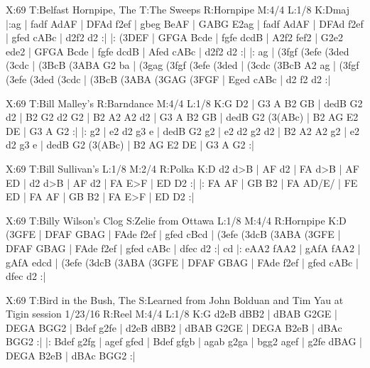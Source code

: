 \documentclass{article}
\begin{document}
\begin{abc}[name]
X:69
T:Belfast Hornpipe, The
T:The Sweeps
R:Hornpipe
M:4/4
L:1/8
K:Dmaj
|:ag | fadf AdAF | DFAd f2ef | gbeg BeAF | GABG E2ag |
fadf AdAF | DFAd f2ef | gfed cABc | d2f2 d2 :|
|: (3DEF | GFGA Bcde | fgfe dcdB | A2f2 fef2 | G2e2 ede2 |
GFGA Bcde | fgfe dcdB | Afed cABc | d2f2 d2 :|
|: ag | (3fgf (3efe (3ded (3cdc | (3BcB (3ABA G2 ba | (3gag (3fgf (3efe (3ded | (3cdc (3BcB A2 ag |
(3fgf (3efe (3ded (3cdc | (3BcB (3ABA (3GAG (3FGF | Eged cABc | d2 f2 d2 :|
\end{abc}

\begin{abc}[name]
X:69
T:Bill Malley's
R:Barndance
M:4/4
L:1/8
K:G
D2 | G3 A B2 GB | dedB G2 d2 | B2 G2 d2 G2 | B2 A2 A2 d2 |
G3 A B2 GB | dedB G2 (3(ABc) | B2 AG E2 DE | G3 A G2 :|
|: g2 | e2 d2 g3 e | dedB G2 g2 | e2 d2 g2 d2 | B2 A2 A2 g2 |
e2 d2 g3 e | dedB G2 (3(ABc) | B2 AG E2 DE | G3 A G2 :|
\end{abc}

\begin{abc}[name]
X:69
T:Bill Sullivan's
L:1/8
M:2/4
R:Polka
K:D
d2 d>B | AF d2 | FA d>B | AF ED |
d2 d>B | AF d2 | FA E>F | ED D2 :|
|: FA AF | GB B2 | FA AD/E/ | FE ED |
FA AF | GB B2 | FA E>F | ED D2 :|
\end{abc}

\begin{abc}[name]
X:69
T:Billy Wilson's Clog
S:Zelie from Ottawa
L:1/8
M:4/4
R:Hornpipe
K:D
(3GFE | DFAF GBAG | FAde f2ef | gfed cBcd | (3efe (3dcB (3ABA (3GFE |
DFAF GBAG | FAde f2ef | gfed cABc | dfec d2 :|
cd |: eAA2 fAA2 | gAfA fAA2 | gAfA edcd | (3efe (3dcB (3ABA (3GFE |
DFAF GBAG | FAde f2ef | gfed cABc | dfec d2 :|
\end{abc}

\begin{abc}[name]
X:69
T:Bird in the Bush, The
S:Learned from John Bolduan and Tim Yau at Tigin session 1/23/16
R:Reel
M:4/4
L:1/8
K:G
d2eB dBB2 | dBAB G2GE | DEGA BGG2 | Bdef g2fe |
d2eB dBB2 | dBAB G2GE | DEGA B2eB | dBAc BGG2 :|
|: Bdef g2fg | agef gfed | Bdef gfgb | agab g2ga |
bgg2 agef | g2fe dBAG | DEGA B2eB | dBAc BGG2 :|
\end{abc}
\end{document}
